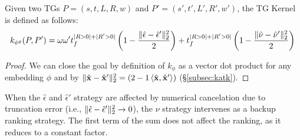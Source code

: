 \begin{proposition}\label{lem:rewritinglemma}
Given two TGs $P=(s,t,L,R,w)$ and $P'=(s',t',L',R',w')$, the TG Kernel is defined as follows:
$$
k_{\phi^{g}}(P,P')=\omega\omega't_f^{|R>0|+|R'>0|}\left(1-\frac{\|\hat{\epsilon}-\hat{\epsilon}'\|_{2}^2}{2}\right)+t_f^{|R>0|+|R'>0|}\left(1-\frac{\|\hat{\nu}-\hat{\nu}'\|_{2}^2}{2}\right)\\$$
\end{proposition}
\begin{proof} We can close the goal by definition of $k_{\phi}$ as a vector dot product for any embedding $\phi$ and by  $\|\hat{\mathbf{x}}-\hat{\mathbf{x}}'\|_2^2=(2-1\braket{\hat{\mathbf{x}},\hat{\mathbf{x}}'})$ (\S\ref{subsec:katk}).	
%	
\end{proof}

When the $\hat{\epsilon}$ and $\hat{\epsilon}'$ strategy are affected by numerical cancelation due to truncation error (i.e., $\|\hat{\epsilon}-\hat{\epsilon}'\|_{2}^2\to 0$), the $\nu$ strategy intervenes as a backup ranking strategy. The first term of the sum does not affect the ranking, as it reduces to a constant factor.

